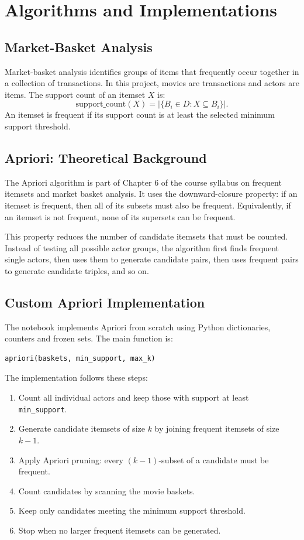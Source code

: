\documentclass[11pt,a4paper]{article}
\begin{document}
\section{Algorithms and Implementations}

\subsection{Market-Basket Analysis}
Market-basket analysis identifies groups of items that frequently occur together in a collection of transactions. In this project, movies are transactions and actors are items. The support count of an itemset $X$ is:
\[
\mathrm{support\_count}(X) = |\{B_i \in D : X \subseteq B_i\}|.
\]
An itemset is frequent if its support count is at least the selected minimum support threshold.

\subsection{Apriori: Theoretical Background}
The Apriori algorithm is part of Chapter 6 of the course syllabus on frequent itemsets and market basket analysis. It uses the downward-closure property: if an itemset is frequent, then all of its subsets must also be frequent. Equivalently, if an itemset is not frequent, none of its supersets can be frequent.

This property reduces the number of candidate itemsets that must be counted. Instead of testing all possible actor groups, the algorithm first finds frequent single actors, then uses them to generate candidate pairs, then uses frequent pairs to generate candidate triples, and so on.

\subsection{Custom Apriori Implementation}
The notebook implements Apriori from scratch using Python dictionaries, counters and frozen sets. The main function is:
\begin{verbatim}
apriori(baskets, min_support, max_k)
\end{verbatim}
The implementation follows these steps:
\begin{enumerate}[leftmargin=*]
    \item Count all individual actors and keep those with support at least \texttt{min\_support}.
    \item Generate candidate itemsets of size $k$ by joining frequent itemsets of size $k-1$.
    \item Apply Apriori pruning: every $(k-1)$-subset of a candidate must be frequent.
    \item Count candidates by scanning the movie baskets.
    \item Keep only candidates meeting the minimum support threshold.
    \item Stop when no larger frequent itemsets can be generated.
\end{enumerate}
\end{document}
